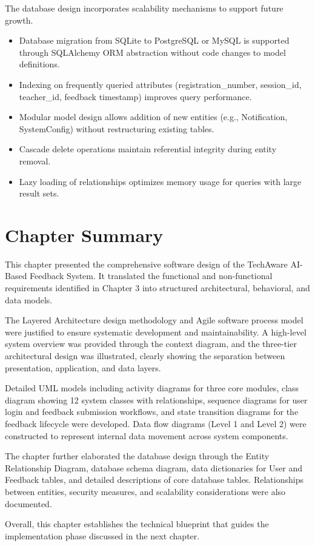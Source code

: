 The database design incorporates scalability mechanisms to support future growth.

\begin{itemize}
    \item Database migration from SQLite to PostgreSQL or MySQL is supported through SQLAlchemy ORM abstraction without code changes to model definitions.
    \item Indexing on frequently queried attributes (registration\_number, session\_id, teacher\_id, feedback timestamp) improves query performance.
    \item Modular model design allows addition of new entities (e.g., Notification, SystemConfig) without restructuring existing tables.
    \item Cascade delete operations maintain referential integrity during entity removal.
    \item Lazy loading of relationships optimizes memory usage for queries with large result sets.
\end{itemize}


\section{Chapter Summary}

This chapter presented the comprehensive software design of the TechAware AI-Based Feedback System. It translated the functional and non-functional requirements identified in Chapter 3 into structured architectural, behavioral, and data models.

The Layered Architecture design methodology and Agile software process model were justified to ensure systematic development and maintainability. A high-level system overview was provided through the context diagram, and the three-tier architectural design was illustrated, clearly showing the separation between presentation, application, and data layers.

Detailed UML models including activity diagrams for three core modules, class diagram showing 12 system classes with relationships, sequence diagrams for user login and feedback submission workflows, and state transition diagrams for the feedback lifecycle were developed. Data flow diagrams (Level 1 and Level 2) were constructed to represent internal data movement across system components.

The chapter further elaborated the database design through the Entity Relationship Diagram, database schema diagram, data dictionaries for User and Feedback tables, and detailed descriptions of core database tables. Relationships between entities, security measures, and scalability considerations were also documented.

Overall, this chapter establishes the technical blueprint that guides the implementation phase discussed in the next chapter.
